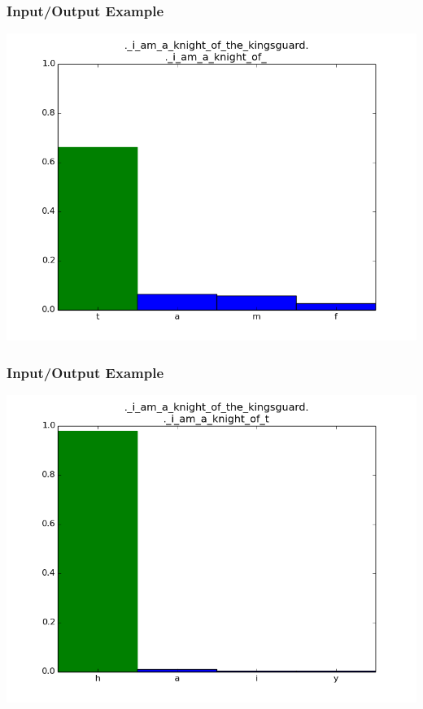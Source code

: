 \documentclass[12]{beamer}
\begin{document}
\begin{frame}
\frametitle{Input/Output Example}
\begin{center}
\includegraphics[scale=0.4]{../distplot/18.png}
\end{center}
\end{frame}

\begin{frame}
\frametitle{Input/Output Example}
\begin{center}
\includegraphics[scale=0.4]{../distplot/19.png}
\end{center}
\end{frame}
\end{document}

